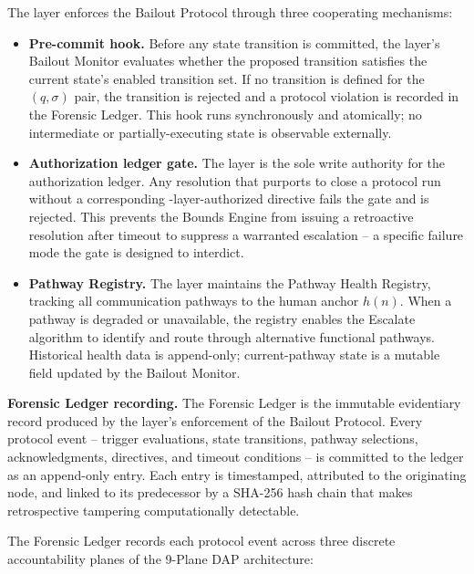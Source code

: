 The \fact{} layer enforces the Bailout Protocol through three cooperating mechanisms:

\begin{itemize}\itemsep=0pt
\item[(\textit{i})] \textbf{Pre-commit hook.} Before any state transition is committed,
the \fact{} layer's Bailout Monitor evaluates whether the proposed transition satisfies
the current state's enabled transition set. If no transition is defined for the
$(q, \sigma)$ pair, the transition is rejected and a protocol violation is recorded in
the Forensic Ledger. This hook runs synchronously and atomically; no intermediate or
partially-executing state is observable externally.

\item[(\textit{ii})] \textbf{Authorization ledger gate.} The \fact{} layer is the sole
write authority for the authorization ledger. Any resolution that purports to close a
protocol run without a corresponding \purpose-layer-authorized directive fails the
gate and is rejected. This prevents the Bounds Engine from issuing a retroactive
resolution after timeout to suppress a warranted escalation -- a specific failure
mode the gate is designed to interdict.

\item[(\textit{iii})] \textbf{Pathway Registry.} The \fact{} layer maintains the
Pathway Health Registry, tracking all communication pathways to the human anchor
$h(n)$. When a pathway is degraded or unavailable, the registry enables the Escalate
algorithm to identify and route through alternative functional pathways. Historical
health data is append-only; current-pathway state is a mutable field updated by the
Bailout Monitor.
\end{itemize}

\medskip\noindent\textbf{Forensic Ledger recording.} The Forensic Ledger is the
immutable evidentiary record produced by the \fact{} layer's enforcement of the
Bailout Protocol. Every protocol event -- trigger evaluations, state transitions,
pathway selections, acknowledgments, directives, and timeout conditions -- is
committed to the ledger as an append-only entry. Each entry is timestamped, attributed
to the originating node, and linked to its predecessor by a SHA-256 hash chain that
makes retrospective tampering computationally detectable.

The Forensic Ledger records each protocol event across three discrete accountability
planes of the 9-Plane DAP architecture:

